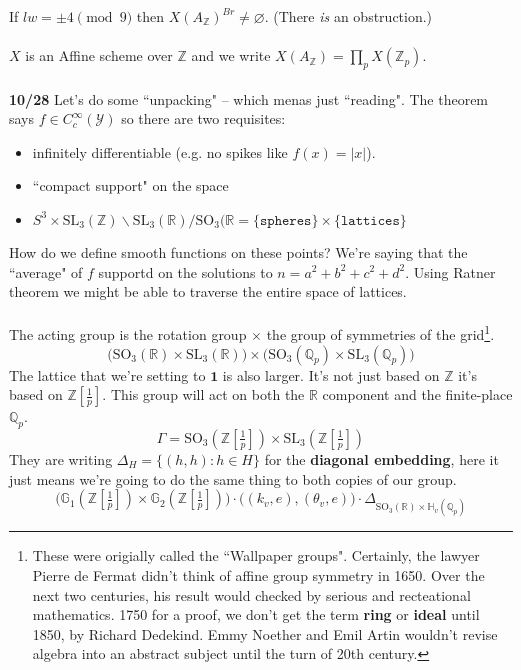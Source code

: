 \documentclass[12pt]{article}
\begin{document}
{If $lw = \pm 4 \pmod 9$ then $X(A_{\mathbb{Z}})^{Br} \neq \varnothing$. (There \textit{is} an obstruction.)\\ \\
$X$ is an Affine scheme over $\mathbb{Z}$ and we write $X(A_{\mathbb{Z}}) = \prod_p X(\mathbb{Z}_p)$. \\ \\
\textbf{10/28} Let's do some ``unpacking" -- which menas just ``reading".  The theorem says $f \in C^\infty_c(\mathcal{Y})$ so there are two requisites:
\begin{itemize}
\item infinitely differentiable (e.g. no spikes like $f(x) = |x|$).
\item ``compact support" on the space
\item $S^3 \times \text{SL}_3(\mathbb{Z}) \backslash \text{SL}_3(\mathbb{R}) / \text{SO}_3(\mathbb{R}  = \{\texttt{spheres}\} \times \{\texttt{lattices}\}$ 
\end{itemize}
How do we define smooth functions on these points? We're saying that the ``average" of $f$ supportd on the solutions to $n = a^2 + b^2 + c^2 + d^2$.  Using Ratner theorem we might be able to traverse the entire space of lattices.  \\ \\
The acting group is the rotation group $\times$ the group of symmetries of the grid\footnote{These were origially called the ``Wallpaper groups".  Certainly, the lawyer Pierre de Fermat didn't think of affine group symmetry in 1650.  Over the next two centuries, his result would checked by serious and recteational mathematics. 1750 for a proof, we don't get the term \textbf{ring} or \textbf{ideal} until 1850, by Richard Dedekind.  Emmy Noether and Emil Artin wouldn't revise algebra into an abstract subject until the turn of 20th century.}.
$$ \big( \text{SO}_3(\mathbb{R}) \times \text{SL}_3(\mathbb{R}) \big) \times 
\big( \text{SO}_3(\mathbb{Q}_p) \times \text{SL}_3(\mathbb{Q}_p) \big)  $$
The lattice that we're setting to $\mathbf{1}$ is also larger.  It's not just based on $\mathbb{Z}$ it's based on $\mathbb{Z}[\frac{1}{p}]$.  This group will act on both the $\mathbb{R}$ component and the finite-place $\mathbb{Q}_p$.
$$ \Gamma = \text{SO}_3(\mathbb{Z}[\tfrac{1}{p}]) \times \text{SL}_3(\mathbb{Z}[\tfrac{1}{p}]) $$
They are writing $\Delta_H = \{ (h,h) : h \in H\}$ for the \textbf{diagonal embedding}, here it just means we're going to do the same thing to both copies of our group.
$$ \big( \mathbb{G}_1(\mathbb{Z}[\tfrac{1}{p}]) \times
\mathbb{G}_2(\mathbb{Z}[\tfrac{1}{p}]) \big) \cdot ((k_v, e), (\theta_v, e) \big) \cdot \Delta_{\text{SO}_3(\mathbb{R}) \times \mathbb{H}_v(\mathbb{Q}_p)}$$
}
\end{document}
